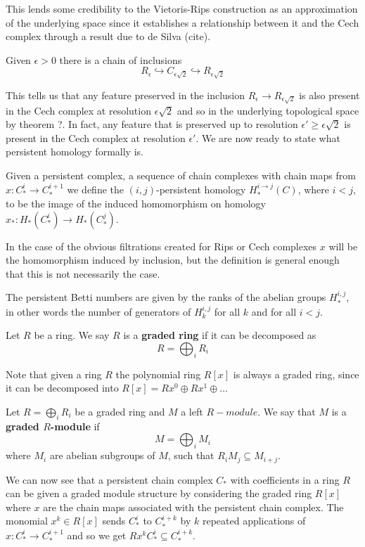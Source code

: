 This lends some credibility to the Vietoris-Rips construction as an approximation of the underlying space since it establishes a relationship between it and the Cech complex through a result due to de Silva (cite).
\begin{lemma}
  Given $\epsilon > 0$ there is a chain of inclusions
  \[R_{\epsilon} \hookrightarrow C_{\epsilon \sqrt{2}} \hookrightarrow R_{\epsilon \sqrt{2}}\]
\end{lemma}
This tells us that any feature preserved in the inclusion $R_{\epsilon} \to R_{\epsilon \sqrt{2}}$ is also present in the Cech complex at resolution $\epsilon \sqrt{2}$ and so in the underlying topological space by theorem ?. In fact, any feature that is preserved up to resolution $\epsilon'\geq \epsilon \sqrt{2}$ is present in the Cech complex at resolution $\epsilon'$.
We are now ready to state what persistent homology formally is.
\begin{definition}
Given a persistent complex, a sequence of chain complexes with chain maps from $x: C_{*}^{i} \to C_{*}^{{i+1}}$ we define the $(i,j)$-persistent homology $H_{*}^{{i\to j}}(C)$, where $i < j$, to be the image of the induced homomorphism on homology $x_{*}: H_{*}(C_{*}^{i}) \to H_{*}(C_{*}^{j})$.
\end{definition}

In the case of the obvious filtrations created for Rips or Cech complexes $x$ will be the homomorphism induced by inclusion, but the definition is general enough that this is not necessarily the case.

\begin{definition}
The persistent Betti numbers are given by the ranks of the abelian groups $H_{*}^{i,j}$, in other words the number of generators of $H_{k}^{{i,j}}$ for all $k$ and for all $i < j$.
\end{definition}

\begin{definition}
  Let $R$ be a ring. We say $R$ is a \textbf{graded ring} if it can be decomposed as
  \[ R = \bigoplus_{i} R_{i}\]
\end{definition}
Note that given a ring $R$ the polynomial ring $R[x]$ is always a graded ring, since it can be decomposed into $R[x] = Rx^{0} \oplus Rx^{1} \oplus \dots$
\begin{definition}
  Let $R = \bigoplus_{{i}} R_{i}$ be a graded ring and $M$ a left $R-module$. We say that $M$ is a \textbf{graded $R$-module} if
  \[M = \bigoplus_{i} M_{i} \]
  where $M_{i}$ are abelian subgroups of $M$, such that $R_{i}M_{j} \subseteq M_{i+j}$.
\end{definition}
We can now see that a persistent chain complex $C_{*}$ with coefficients in a ring $R$ can be given a graded module structure by considering the graded ring $R[x]$ where $x$ are the chain maps associated with the persistent chain complex. The monomial $x^{k} \in R[x]$ sends $C_{*}^{{i}}$ to $C_{*}^{{i+k}}$ by $k$ repeated applications of $x: C_{*}^{{i}} \to C_{*}^{{i+1}}$ and so we get $Rx^{k}C^{i}_{*} \subseteq C^{{i+k}}_{*}$.

